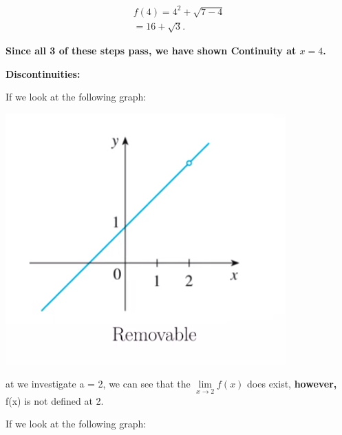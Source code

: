 \documentclass{report}
\begin{document}
        \begin{align*}
            f \left(4\right) = 4^2 + \sqrt{7-4} \\ 
            = 16 + \sqrt{3}
        .\end{align*}

        \bigbreak \noindent 
        \textbf{Since all 3 of these steps pass, we have shown Continuity at $ x = 4 $.}

        \pagebreak
        \begin{large}
            \noindent \textbf{Discontinuities:}
        \end{large} 

        \bigbreak \noindent \bigbreak \noindent 
        If we look at the following graph:

        \bigbreak \noindent 
        \begin{center}
            \includegraphics[scale=0.7]{../images/1.png}
        \end{center}

        \bigbreak \noindent 
        at we investigate a = 2, we can see that the $\lim\limits_{x \to 2}{f \left(x\right)}$
        does exist, \textbf{however,} f(x) is not defined at 2.

        \bigbreak \noindent \bigbreak \noindent 
        If we look at the following graph:
\end{document}

